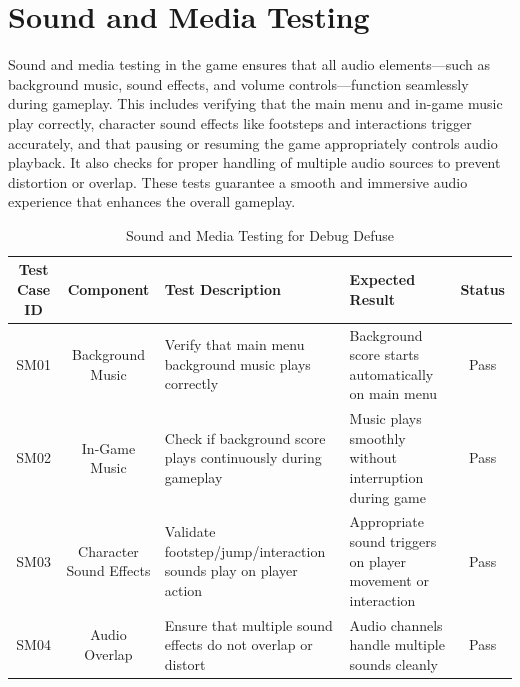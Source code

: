 \section{Sound and Media Testing}
Sound and media testing in the game ensures that all audio elements—such as background music, sound effects, and volume controls—function seamlessly during gameplay. This includes verifying that the main menu and in-game music play correctly, character sound effects like footsteps and interactions trigger accurately, and that pausing or resuming the game appropriately controls audio playback. It also checks for proper handling of multiple audio sources to prevent distortion or overlap. These tests guarantee a smooth and immersive audio experience that enhances the overall gameplay.
\begin{table}[H]
    \centering
    \renewcommand{\arraystretch}{1.3}
    \small
    \begin{tabular}{|c|c|p{3cm}|p{3cm}|c|}
        \hline
        \textbf{Test Case ID} & \textbf{Component} & \textbf{Test Description} & \textbf{Expected Result} & \textbf{Status} \\
        \hline
        SM01 & Background Music & \raggedright Verify that main menu background music plays correctly & \raggedright Background score starts automatically on main menu & Pass \\
        \hline
        SM02 & In-Game Music & \raggedright Check if background score plays continuously during gameplay & \raggedright Music plays smoothly without interruption during game & Pass \\
        \hline
        SM03 & Character Sound Effects & \raggedright Validate footstep/jump/interaction sounds play on player action & \raggedright Appropriate sound triggers on player movement or interaction & Pass \\
        \hline
        SM04 & Audio Overlap & \raggedright Ensure that multiple sound effects do not overlap or distort & \raggedright Audio channels handle multiple sounds cleanly & Pass \\
        \hline
    \end{tabular}
    \caption{Sound and Media Testing for Debug Defuse}
    \label{tab:sound_media_tests}
\end{table}

\newpage

